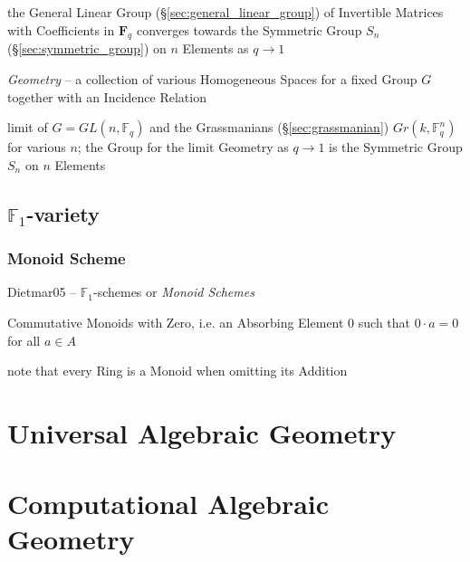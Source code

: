 the General Linear Group (\S\ref{sec:general_linear_group}) of Invertible
Matrices with Coefficients in $\mathbf{F}_q$ converges towards the Symmetric
Group $S_n$ (\S\ref{sec:symmetric_group}) on $n$ Elements as $q \rightarrow 1$

\emph{Geometry} -- a collection of various Homogeneous Spaces for a fixed Group
$G$ together with an Incidence Relation

limit of $G = GL(n,\mathbb{F}_q)$ and the Grassmanians (\S\ref{sec:grassmanian})
$Gr(k,\mathbb{F}^n_q)$ for various $n$; the Group for the limit Geometry as
$q \rightarrow 1$ is the Symmetric Group $S_n$ on $n$ Elements



\subsection{$\mathbb{F}_1$-variety}\label{sec:f1_variety}

\subsubsection{Monoid Scheme}\label{sec:monoid_scheme}

Dietmar05 -- $\mathbb{F}_1$-schemes or \emph{Monoid Schemes}

Commutative Monoids with Zero, i.e. an Absorbing Element $0$ such that $0 \cdot
a = 0$ for all $a \in A$

note that every Ring is a Monoid when omitting its Addition



\section{Universal Algebraic Geometry}\label{sec:universal_geometry}

\section{Computational Algebraic Geometry}
\label{sec:computational_algebraic_geometry}

